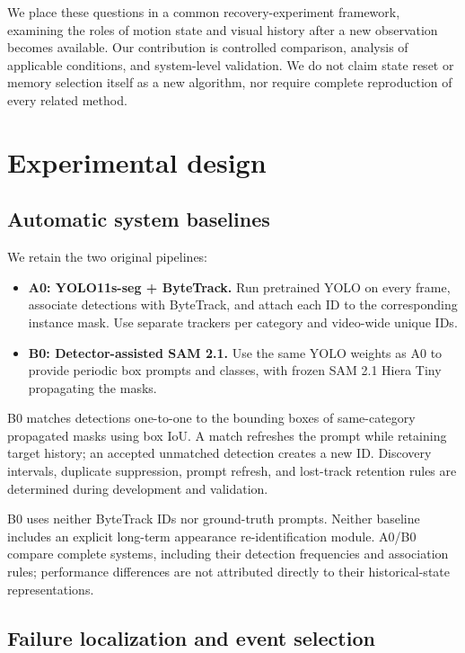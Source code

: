 \documentclass{article}
\begin{document}
We place these questions in a common recovery-experiment framework, examining the roles of motion state and visual history after a new observation becomes available. Our contribution is controlled comparison, analysis of applicable conditions, and system-level validation. We do not claim state reset or memory selection itself as a new algorithm, nor require complete reproduction of every related method.

\section{Experimental design}

\subsection{Automatic system baselines}

We retain the two original pipelines:

\begin{itemize}

\item \textbf{A0: YOLO11s-seg + ByteTrack.} Run pretrained YOLO on every frame, associate detections with ByteTrack, and attach each ID to the corresponding instance mask. Use separate trackers per category and video-wide unique IDs.

\item \textbf{B0: Detector-assisted SAM 2.1.} Use the same YOLO weights as A0 to provide periodic box prompts and classes, with frozen SAM 2.1 Hiera Tiny propagating the masks.

\end{itemize}

B0 matches detections one-to-one to the bounding boxes of same-category propagated masks using box IoU. A match refreshes the prompt while retaining target history; an accepted unmatched detection creates a new ID. Discovery intervals, duplicate suppression, prompt refresh, and lost-track retention rules are determined during development and validation.

B0 uses neither ByteTrack IDs nor ground-truth prompts. Neither baseline includes an explicit long-term appearance re-identification module. A0/B0 compare complete systems, including their detection frequencies and association rules; performance differences are not attributed directly to their historical-state representations.

\subsection{Failure localization and event selection}
\end{document}
